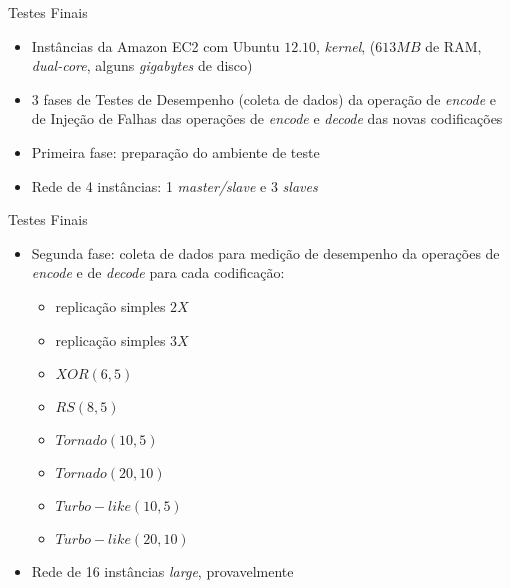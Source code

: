   \begin{frame}{Testes Finais}

     \begin{itemize}
        \item<1-> Instâncias da Amazon EC2 com Ubuntu $12.10$,  \emph{kernel},  ($613MB$ de RAM, \emph{dual-core}, alguns \emph{gigabytes} de disco) 
        \item<2-> 3 fases de Testes de Desempenho (coleta de dados) da operação de \emph{encode} e de Injeção de Falhas das operações de \emph{encode} e \emph{decode} das novas codificações
        \item<3-> Primeira fase: preparação do ambiente de teste
        \item<4-> Rede de 4 instâncias: 1 \emph{master/slave} e 3 \emph{slaves}
     \end{itemize}
  \end{frame}

  \begin{frame}{Testes Finais}
     \begin{itemize}
              \item<1-> Segunda fase: coleta de dados para medição de desempenho da operações de \emph{encode} e de \emph{decode} para cada codificação:
                  \begin{itemize}
                     \item replicação simples $2X$
                     \item replicação simples $3X$
                     \item $XOR(6,5)$
                     \item $RS(8,5)$
                     \item $Tornado(10,5)$
                     \item $Tornado(20,10)$
                     \item $Turbo-like(10,5)$
                     \item $Turbo-like(20,10)$
                 \end{itemize}
              \item<2-> Rede de 16 instâncias \emph{large}, provavelmente
     \end{itemize}
  \end{frame}

